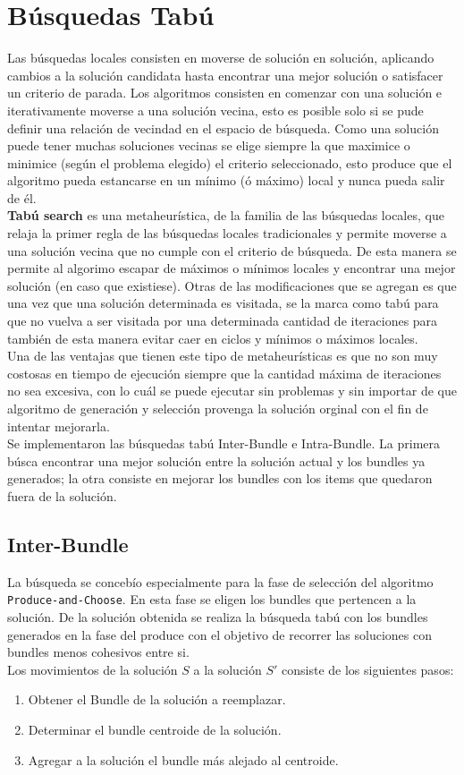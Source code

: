 \section{Búsquedas Tabú}
Las búsquedas locales consisten en moverse de solución en solución, aplicando cambios a la solución candidata hasta encontrar una mejor solución o satisfacer un criterio de parada. Los algoritmos consisten en comenzar con una solución e iterativamente moverse a una solución vecina, esto es posible solo si se pude definir una relación de vecindad en el espacio de búsqueda. Como una solución puede tener muchas soluciones vecinas se elige siempre la que maximice o minimice (según el problema elegido) el criterio seleccionado, esto produce que el algoritmo pueda estancarse en un mínimo (ó máximo) local y nunca pueda salir de él.\\
\textbf{Tabú search} es una metaheurística, de la familia de las búsquedas locales, que relaja la primer regla de las búsquedas locales tradicionales y permite moverse a una solución vecina que no cumple con el criterio de búsqueda. De esta manera se permite al algorimo escapar de máximos o mínimos locales y encontrar una mejor solución (en caso que existiese). Otras de las modificaciones que se agregan es que una vez que una solución determinada es visitada, se la marca como tabú para que no vuelva a ser visitada por una determinada cantidad de iteraciones para también de esta manera evitar caer en ciclos y mínimos o máximos locales.\\
Una de las ventajas que tienen este tipo de metaheurísticas es que no son muy costosas en tiempo de ejecución siempre que la cantidad máxima de iteraciones no sea excesiva, con lo cuál se puede ejecutar sin problemas y sin importar de que algoritmo de generación y selección provenga la solución orginal con el fin de intentar mejorarla.\\
Se implementaron las búsquedas tabú Inter-Bundle e Intra-Bundle.
La primera búsca encontrar una mejor solución entre la solución actual y los bundles ya generados; la otra consiste en mejorar los bundles con los items que quedaron fuera de la solución. 

\subsection{Inter-Bundle}
La búsqueda se concebío especialmente para la fase de selección del algoritmo \texttt{Produce-and-Choose}. En esta fase se eligen los bundles que pertencen a la solución. De la solución obtenida se realiza la búsqueda tabú con los bundles generados en la fase del produce con el objetivo de recorrer las soluciones con bundles menos cohesivos entre si.\\
Los movimientos de la solución $S$ a la solución $S'$ consiste de los siguientes  pasos:
\begin{enumerate}
	\item Obtener el Bundle de la solución a reemplazar.
	\item Determinar el bundle centroide de la solución.
	\item Agregar a la solución el bundle más alejado al centroide.
\end{enumerate}

